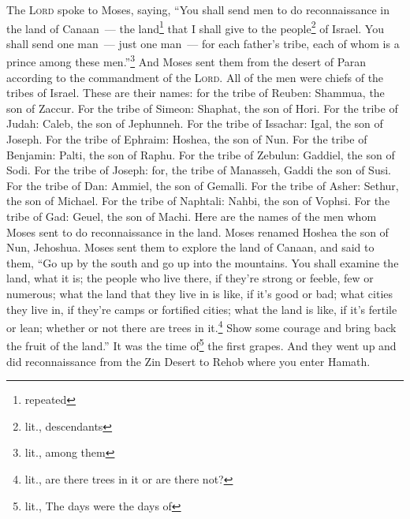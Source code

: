 
\begin{inparaenum}
     The \textsc{Lord} spoke to Moses, saying,%
     ``You shall send men to do reconnaissance in the land of Canaan~--- the land\footnote{repeated} that I shall give to the people\footnote{lit., descendants} of Israel. You shall send one man~--- just one man~--- for each father's tribe, each of whom is a prince among these men.''\footnote{lit., among them}%
     And Moses sent them from the desert of Paran according to the commandment of the \textsc{Lord}. All of the men were chiefs of the tribes of Israel.%
     These are their names: for the tribe of Reuben: Shammua, the son of Zaccur.%
     For the tribe of Simeon: Shaphat, the son of Hori.%
     For the tribe of Judah: Caleb, the son of Jephunneh.%
     For the tribe of Issachar: Igal, the son of Joseph.%
     For the tribe of Ephraim: Hoshea, the son of Nun.%
     For the tribe of Benjamin: Palti, the son of Raphu.%
     For the tribe of Zebulun: Gaddiel, the son of Sodi.%
     For the tribe of Joseph: for, the tribe of Manasseh, Gaddi the son of Susi.%
     For the tribe of Dan: Ammiel, the son of Gemalli.%
     For the tribe of Asher: Sethur, the son of Michael.%
     For the tribe of Naphtali: Nahbi, the son of Vophsi.%
     For the tribe of Gad: Geuel, the son of Machi.%
     Here are the names of the men whom Moses sent to do reconnaissance in the land. Moses renamed Hoshea the son of Nun, Jehoshua.%
     Moses sent them to explore the land of Canaan, and said to them, ``Go up by the south and go up into the mountains.%
     You shall examine the land, what it is; the people who live there, if they're strong or feeble, few or numerous;%
     what the land that they live in is like, if it's good or bad; what cities they live in, if they're camps or fortified cities;%
     what the land is like, if it's fertile or lean; whether or not there are trees in it.\footnote{lit., are there trees in it or are there not?} Show some courage and bring back the fruit of the land.'' It was the time of\footnote{lit., The days were the days of} the first grapes.%
     And they went up and did reconnaissance from the Zin Desert to Rehob where you enter Hamath.%

\end{inparaenum}
